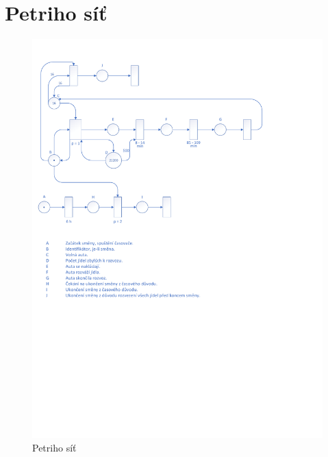 \documentclass[a4paper, 11pt]{article}
\begin{document}
	\section{Petriho síť}
	\label{appendix:petri_net}
	\begin{figure}[!ht]
		\centering
		\vspace{-1.2cm}
		\includegraphics[width=0.95\linewidth]{inc/petri_net.pdf}
		\caption{Petriho síť}
		\label{figure:petri_net}
	\end{figure}
\end{document}
